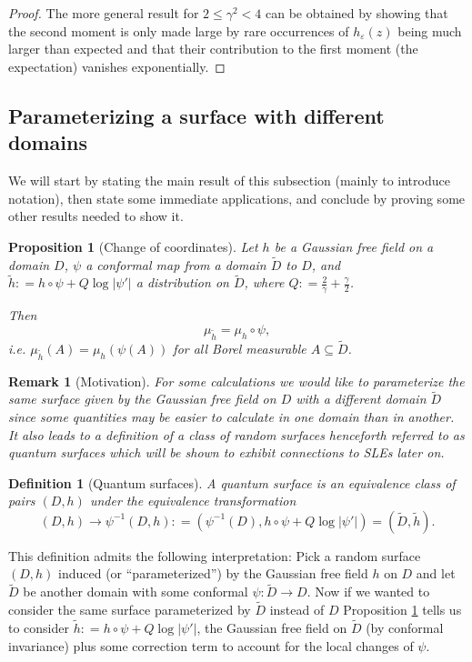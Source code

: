 \documentclass[11pt,reqno]{amsart}
\numberwithin{equation}{section}
\newtheorem{pro}[thm]{Proposition}
\newtheorem{defi}[thm]{Definition}
\newtheorem{rem}[thm]{Remark}
\newcommand{\deq}{\mathrel{\mathop:}=}
\newcommand{\eps}{\varepsilon}
\begin{document}
\begin{proof}
	The more general result for $2\leq\gamma^2<4$ can be obtained by showing that the second moment is only made large by rare occurrences of $h_\eps(z)$ being much larger than expected and that their contribution to the first moment (the expectation) vanishes exponentially.
\end{proof}

\subsection{Parameterizing a surface with different domains}
We will start by stating the main result of this subsection (mainly to introduce notation), then state some immediate applications, and conclude by proving some other results needed to show it.
\begin{pro}[Change of coordinates]\label{prop:changeofcoordinates}
	Let $h$ be a Gaussian free field on a domain $D$, $\psi$ a conformal map from a domain $\tilde D$ to $D$, and $\tilde h\deq h\circ\psi+Q\log|\psi'|$ a distribution on $\tilde D$, where $Q\deq \frac{2}{\gamma}+\frac{\gamma}{2}$.
	
	Then $$\mu_{\tilde h}=\mu_h\circ\psi,$$
	i.e. $\mu_{\tilde h}(A)=\mu_h(\psi(A))$ for all Borel measurable $A\subseteq \tilde D$.
\end{pro}
\begin{rem}[Motivation]
	For some calculations we would like to parameterize the same surface given by the Gaussian free field on $D$ with a different domain $\tilde D$ since some quantities may be easier to calculate in one domain than in another. It also leads to a definition of a class of random surfaces henceforth referred to as quantum surfaces which will be shown to exhibit connections to SLEs later on.
\end{rem}

\begin{defi}[Quantum surfaces]\label{def:quantumsurface}
	A quantum surface is an equivalence class of pairs $(D,h)$ under the equivalence transformation $$(D,h)\rightarrow \psi^{-1}(D,h)\deq (\psi^{-1}(D),h\circ\psi+Q\log|\psi'|)=(\tilde D,\tilde h).$$
\end{defi}

This definition admits the following interpretation: Pick a random surface $(D,h)$ induced (or ``parameterized'') by the Gaussian free field $h$ on $D$ and let $\tilde D$ be another domain with some conformal $\psi:\tilde D\rightarrow D$. Now if we wanted to consider the same surface parameterized by $\tilde D$ instead of $D$ Proposition \ref{prop:changeofcoordinates} tells us to consider $\tilde h\deq h\circ\psi + Q\log|\psi'|$, the Gaussian free field on $\tilde D$ (by conformal invariance) plus some correction term to account for the local changes of $\psi$.
\end{document}
